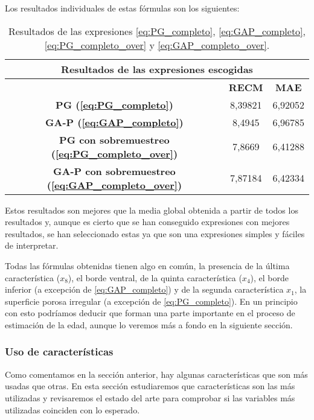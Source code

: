 Los resultados individuales de estas fórmulas son los siguientes:


\begin{table}[H]
\centering
\begin{tabular}{|c|c|c|}
\hline
\multicolumn{3}{|c|}{\textbf{Resultados de las expresiones escogidas}}   \\ \hline
\textbf{}                       & \textbf{RECM}    & \textbf{MAE}        \\ \hline
\textbf{PG (\ref{eq:PG_completo})}                     & 8,39821          & 6,92052             \\ \hline
\textbf{GA-P (\ref{eq:GAP_completo})}                   & 8,4945           & 6,96785             \\ \hline
\textbf{PG con sobremuestreo (\ref{eq:PG_completo_over})}   & 7,8669           & 6,41288             \\ \hline
\textbf{GA-P con sobremuestreo (\ref{eq:GAP_completo_over})} & 7,87184          & 6,42334             \\ \hline
\end{tabular}%
\caption{Resultados de las expresiones \ref{eq:PG_completo}, \ref{eq:GAP_completo}, \ref{eq:PG_completo_over} y \ref{eq:GAP_completo_over}.}\label{table:resultados_escogidas}
\end{table}

Estos resultados son mejores que la media global obtenida a partir de todos los resultados y, aunque es cierto que se han conseguido expresiones con mejores resultados, se han seleccionado estas ya que son una expresiones simples y fáciles de interpretar.

Todas las fórmulas obtenidas tienen algo en común, la presencia de la última característica ($x_8$), el borde ventral, de la quinta característica ($x_4$), el borde inferior (a excepción de \ref{eq:GAP_completo}) y de la segunda característica $x_1$, la superficie porosa irregular (a excepción de \ref{eq:PG_completo}). En un principio con esto podríamos deducir que forman una parte importante en el proceso de estimación de la edad, aunque lo veremos más a fondo en la siguiente sección.



\subsubsection{Uso de características}

Como comentamos en la sección anterior, hay algunas características que son más usadas que otras. En esta sección estudiaremos que características son las más utilizadas y revisaremos el estado del arte para comprobar si las variables más utilizadas coinciden con lo esperado.

